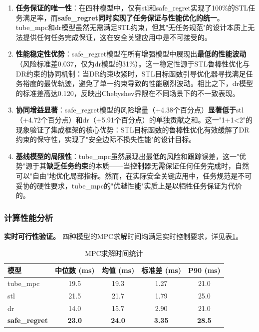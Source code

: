 \documentclass[12pt,a4paper]{ctexart}
\numberwithin{equation}{section}
\begin{document}
\begin{enumerate}[label=(\arabic*)]
    \item \textbf{任务保证的唯一性}：在四种模型中，仅有stl和safe\_regret实现了100\%的STL任务满足率，而\textbf{safe\_regret同时实现了任务保证与性能优化的统一}。tube\_mpc和dr模型虽然无需满足STL约束，但其"无任务规范"的设计本质上无法提供任何任务完成保证，这在安全关键应用中是不可接受的。

    \item \textbf{性能稳定性优势}：safe\_regret模型在所有增强模型中展现出\textbf{最低的性能波动}（风险标准差0.037，仅为dr模型的31\%）。这一稳定性源于STL鲁棒性优化与DR约束的协同机制：当DR约束收紧时，STL目标函数引导优化器寻找满足任务裕度的最优轨迹，避免了单一约束导致的性能剧烈波动。相比之下，dr模型的标准差高达0.120，反映出Chebyshev界限在不同场景下的不一致表现。

    \item \textbf{协同增益显著}：safe\_regret模型的风险增量（+4.38个百分点）\textbf{显著低于}stl（+4.72个百分点）和dr（+5.91个百分点）的单独贡献之和。这一"1+1<2"的现象验证了集成框架的核心优势：STL目标函数的鲁棒性优化有效缓解了DR约束的保守性，实现了"安全边际不损失性能"的设计目标。

    \item \textbf{基线模型的局限性}：tube\_mpc虽然展现出最低的风险和跟踪误差，这一"优势"源于其\textbf{缺乏任务约束}的本质——当控制器无需保证任何任务完成时，自然可以"自由"地优化局部指标。然而，在实际安全关键应用中，任务规范是不可妥协的硬性要求，tube\_mpc的"优越性能"实质上是以牺牲任务保证为代价的。
\end{enumerate}

\subsubsection{计算性能分析}

\textbf{实时可行性验证。} 四种模型的MPC求解时间均满足实时控制要求，详见表\ref{tab:solve_time}。

\begin{table}[htbp]
    \centering
    \caption{MPC求解时间统计}
    \label{tab:solve_time}
    \begin{tabular}{lcccc}
        \toprule
        模型 & 中位数 (ms) & 均值 (ms) & 标准差 (ms) & P90 (ms) \\
        \midrule
        tube\_mpc & 19.5 & 19.3 & 1.27 & 21.0 \\
        stl & 21.5 & 21.7 & 1.79 & 25.0 \\
        dr & 14.0 & 15.7 & 2.90 & 21.0 \\
        \textbf{safe\_regret} & \textbf{23.0} & \textbf{24.0} & \textbf{3.35} & \textbf{28.5} \\
        \bottomrule
    \end{tabular}
\end{table}
\end{document}
